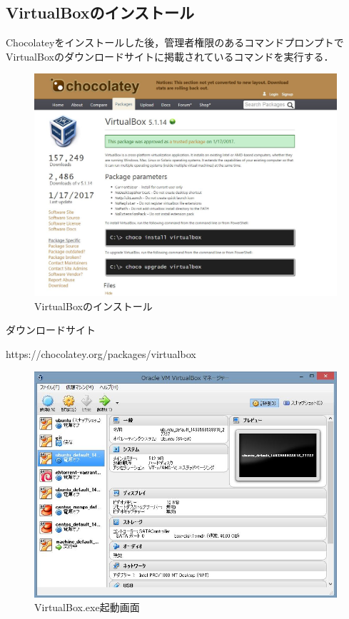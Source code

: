 \newpage

\subsection{VirtualBoxのインストール}
Chocolateyをインストールした後，管理者権限のあるコマンドプロンプトでVirtualBoxのダウンロードサイトに掲載されているコマンドを実行する．

\begin{figure}[htb]
\centering
\includegraphics[width=12cm]{VirtualBox.JPG}
\caption{VirtualBoxのインストール}\label{サンプル図}
\end{figure}


ダウンロードサイト

https://chocolatey.org/packages/virtualbox

\newpage

\begin{figure}[htb]
\centering
\includegraphics[width=12cm]{virtualboxkidou.JPG}
\caption{VirtualBox.exe起動画面}\label{サンプル図}
\end{figure}


